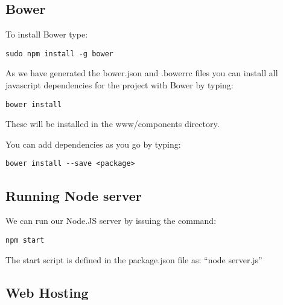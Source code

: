 \documentclass[twocolumn]{article}
\begin{document}
\subsection{Bower}
To install Bower type:

\begin{lstlisting}
sudo npm install -g bower
\end{lstlisting}

As we have generated the bower.json and .bowerrc files you can install all javascript dependencies for the project with Bower by typing:
\begin{lstlisting}
bower install
\end{lstlisting}
These will be installed in the www/components directory.

You can add dependencies as you go by typing:
\begin{lstlisting}
bower install --save <package>
\end{lstlisting}

\subsection{Running Node server}
We can run our Node.JS server by issuing the command:
\begin{lstlisting}
npm start
\end{lstlisting}
The start script is defined in the package.json file as: ``node server.js''

\subsection{Web Hosting}
\end{document}
